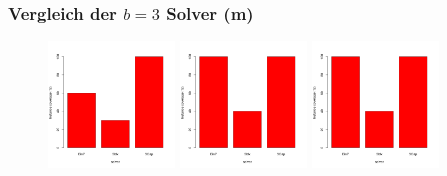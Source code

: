 \documentclass{beamer}
\begin{document}
\begin{frame}
\frametitle{Vergleich der $b = 3$ Solver (m)}

\begin{figure}
\centering
\includegraphics[width=0.3\textwidth]{images/solver_instance_coverage_b=3_medium_600s.png}
\includegraphics[width=0.3\textwidth]{images/solver_instance_coverage_b=3_medium_1200s.png}
\includegraphics[width=0.3\textwidth]{images/solver_instance_coverage_b=3_medium_1800s.png}
\caption*{\textsc{Zeitlimit 10min} $\quad\quad\quad$ \textsc{Zeitlimit 20min} $\quad\quad\quad$ \textsc{Zeitlimit 30min}}
\begin{subfigure}[b]{0.3\textwidth}
\centering
{}
\end{subfigure}
\end{figure}
\end{frame}
\end{document}
